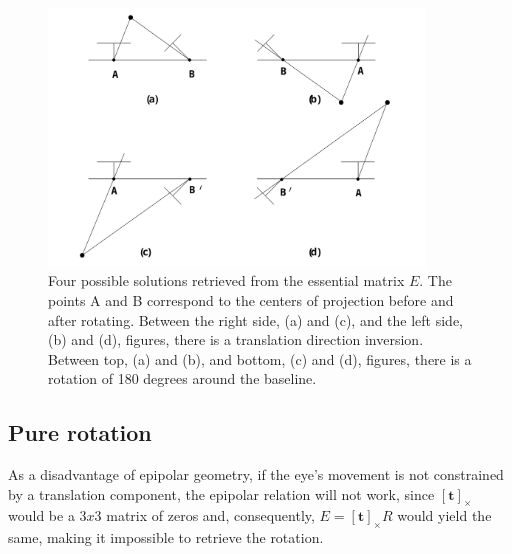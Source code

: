 \begin{figure}[ht]
	\centering
	\includegraphics[width=10cm]{images/ep4sols.png}
	\caption[Four possible solutions retrieved from $E$]{Four possible solutions retrieved from the essential matrix $E$. The points A and B correspond to the centers of projection before and after rotating. Between the right side, (a) and (c), and the left side, (b) and (d), figures, there is a translation direction inversion. Between top, (a) and (b), and bottom, (c) and (d), figures, there is a rotation of 180 degrees around the baseline. \cite{multiview}}
	\label{sec2:fig:ep4}
\end{figure}

\subsection{Pure rotation}
\label{urerrrrr}
As a disadvantage of epipolar geometry, if the eye's movement is not constrained by a translation component, the epipolar relation will not work, since $[\mathbf{t}]_\times$ would be a $3x3$ matrix of zeros and, consequently, $E = [\mathbf{t}]_\times R$ would yield the same, making it impossible to retrieve the rotation.\\



